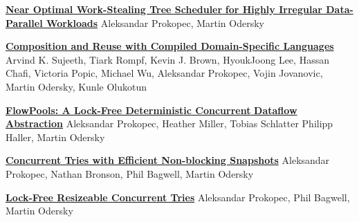 \documentclass[9pt]{article}
\begin{document}
\noindent\href{http://axel22.github.io/resources/docs/lcpc2013_submission_6.pdf}
{\bf Near Optimal Work-Stealing Tree Scheduler }
\newline
\noindent\href{http://axel22.github.io/resources/docs/lcpc2013_submission_6.pdf}
{\bf for Highly Irregular Data-Parallel Workloads}
\newline
\noindent Aleksandar Prokopec, Martin Odersky
\newline
{}
\bigskip

\noindent\href{http://axel22.github.io/resources/docs/ecoop13_sujeeth.pdf}
{\bf Composition and Reuse with Compiled Domain-Specific Languages}
\newline
\noindent Arvind K. Sujeeth, Tiark Rompf, Kevin J. Brown,
\newline
\noindent HyoukJoong Lee,
          Hassan Chafi, Victoria Popic, Michael Wu,
\newline
\noindent Aleksandar Prokopec,
          Vojin Jovanovic, Martin Odersky, Kunle Olukotun
\newline
{}
\bigskip

\noindent\href{http://axel22.github.io/resources/docs/lcpc2012.pdf}
{\bf FlowPools: A Lock-Free Deterministic Concurrent }
\newline
\noindent\href{http://axel22.github.io/resources/docs/lcpc2012.pdf}
{\bf Dataflow Abstraction}
\newline
\noindent Aleksandar Prokopec, Heather Miller, Tobias Schlatter
\newline
\noindent Philipp Haller, Martin Odersky
\newline
{}
\bigskip

\noindent\href{http://axel22.github.io/resources/docs/ctries-snapshot.pdf}
{\bf Concurrent Tries with Efficient Non-blocking Snapshots}
\newline
\noindent Aleksandar Prokopec, Nathan Bronson, Phil Bagwell, Martin Odersky
\newline
{}
\bigskip

\noindent\href{http://lampwww.epfl.ch/~prokopec/lcpc_ctries.pdf}
{\bf Lock-Free Resizeable Concurrent Tries}
\newline
\noindent Aleksandar Prokopec, Phil Bagwell, Martin Odersky
\newline
{}
\bigskip
\end{document}
